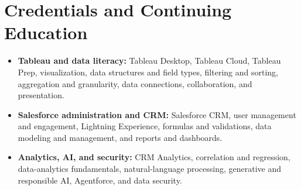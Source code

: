 \section{Credentials and Continuing Education}
\label{sec:credentials_and_continuing_education}

\begin{itemize}
  \item \textbf{Tableau and data literacy:} Tableau Desktop, Tableau Cloud, Tableau Prep, visualization, data structures and field types, filtering and sorting, aggregation and granularity, data connections, collaboration, and presentation.
  \item \textbf{Salesforce administration and CRM:} Salesforce CRM, user management and engagement, Lightning Experience, formulas and validations, data modeling and management, and reports and dashboards.
  \item \textbf{Analytics, AI, and security:} CRM Analytics, correlation and regression, data-analytics fundamentals, natural-language processing, generative and responsible AI, Agentforce, and data security.
\end{itemize}

\smallskip
{}

